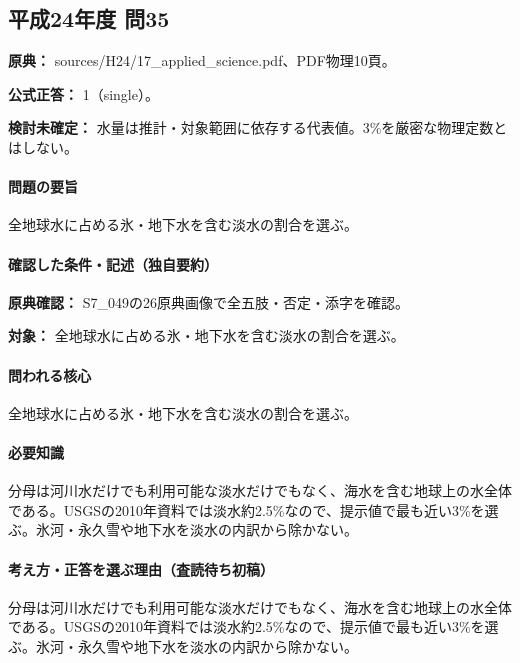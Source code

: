 \subsection{平成24年度 問35}
\label{q:h24-reg-applied-35}

\noindent\textbf{原典：} sources/H24/17\_applied\_science.pdf、PDF物理10頁。

\textbf{公式正答：} 1（single）。

\par\textbf{検討未確定：} 水量は推計・対象範囲に依存する代表値。3\%を厳密な物理定数とはしない。

\paragraph{問題の要旨} 全地球水に占める氷・地下水を含む淡水の割合を選ぶ。

\paragraph{確認した条件・記述（独自要約）}\mbox{}\par

\noindent\textbf{原典確認：} S7\_049の26原典画像で全五肢・否定・添字を確認。\par

\noindent\textbf{対象：} 全地球水に占める氷・地下水を含む淡水の割合を選ぶ。\par

\paragraph{問われる核心} 全地球水に占める氷・地下水を含む淡水の割合を選ぶ。

\paragraph{必要知識} 分母は河川水だけでも利用可能な淡水だけでもなく、海水を含む地球上の水全体である。USGSの2010年資料では淡水約2.5\%なので、提示値で最も近い3\%を選ぶ。氷河・永久雪や地下水を淡水の内訳から除かない。

\paragraph{考え方・正答を選ぶ理由（査読待ち初稿）} 分母は河川水だけでも利用可能な淡水だけでもなく、海水を含む地球上の水全体である。USGSの2010年資料では淡水約2.5\%なので、提示値で最も近い3\%を選ぶ。氷河・永久雪や地下水を淡水の内訳から除かない。

